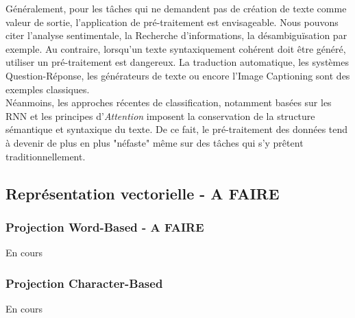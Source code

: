 \noindent Généralement, pour les tâches qui ne demandent pas de création de texte comme valeur de sortie, l'application de pré-traitement est envisageable. Nous pouvons citer l'analyse sentimentale, la Recherche d'informations, la désambiguïsation par exemple. Au contraire, lorsqu'un texte syntaxiquement cohérent doit être généré, utiliser un pré-traitement est dangereux. La traduction automatique, les systèmes Question-Réponse, les générateurs de texte ou encore l'Image Captioning sont des exemples classiques.\\

\noindent Néanmoins, les approches récentes de classification, notamment basées sur les RNN et les principes d'\textit{Attention} imposent la conservation de la structure sémantique et syntaxique du texte. De ce fait, le pré-traitement des données tend à devenir de plus en plus "néfaste" même sur des tâches qui s'y prêtent traditionnellement.

\subsection{Représentation vectorielle - A FAIRE}
 \subsubsection{Projection Word-Based - A FAIRE}
En cours
\subsubsection{Projection Character-Based}
En cours
